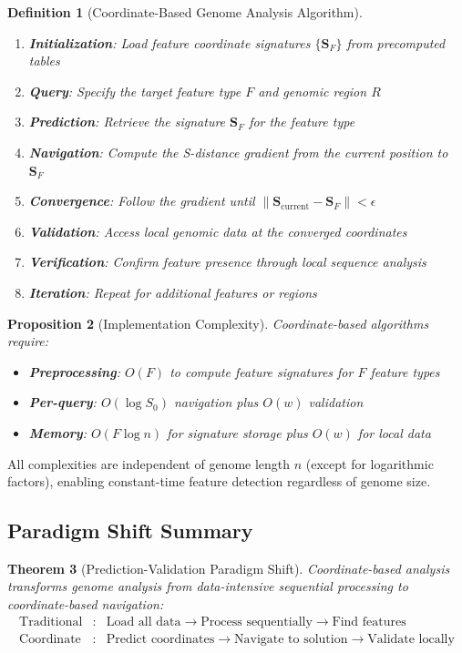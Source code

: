 \documentclass[11pt,a4paper]{article}
\newtheorem{theorem}{Theorem}[section]
\newtheorem{definition}[theorem]{Definition}
\newtheorem{proposition}[theorem]{Proposition}
\theoremstyle{remark}
\newcommand{\Scoord}{\mathbf{S}}
\begin{document}
\begin{definition}[Coordinate-Based Genome Analysis Algorithm]
\label{def:coordinate_algorithm}
\begin{enumerate}
\item \textbf{Initialization}: Load feature coordinate signatures $\{\Scoord_F\}$ from precomputed tables
\item \textbf{Query}: Specify the target feature type $F$ and genomic region $R$
\item \textbf{Prediction}: Retrieve the signature $\Scoord_F$ for the feature type
\item \textbf{Navigation}: Compute the S-distance gradient from the current position to $\Scoord_F$
\item \textbf{Convergence}: Follow the gradient until $\|\Scoord_{\text{current}} - \Scoord_F\| < \epsilon$
\item \textbf{Validation}: Access local genomic data at the converged coordinates
\item \textbf{Verification}: Confirm feature presence through local sequence analysis
\item \textbf{Iteration}: Repeat for additional features or regions
\end{enumerate}
\end{definition}

\begin{proposition}[Implementation Complexity]
\label{prop:implementation_complexity}
Coordinate-based algorithms require:
\begin{itemize}
\item \textbf{Preprocessing}: $O(F)$ to compute feature signatures for $F$ feature types
\item \textbf{Per-query}: $O(\log S_0)$ navigation plus $O(w)$ validation
\item \textbf{Memory}: $O(F \log n)$ for signature storage plus $O(w)$ for local data
\end{itemize}
\end{proposition}

All complexities are independent of genome length $n$ (except for logarithmic factors), enabling constant-time feature detection regardless of genome size.

\subsection{Paradigm Shift Summary}

\begin{theorem}[Prediction-Validation Paradigm Shift]
\label{thm:paradigm_shift}
Coordinate-based analysis transforms genome analysis from data-intensive sequential processing to coordinate-based navigation:
\begin{equation}
\begin{array}{rcl}
\text{Traditional} &:& \text{Load all data} \to \text{Process sequentially} \to \text{Find features} \\
\text{Coordinate} &:& \text{Predict coordinates} \to \text{Navigate to solution} \to \text{Validate locally}
\end{array}
\end{equation}
\end{theorem}
\end{document}
